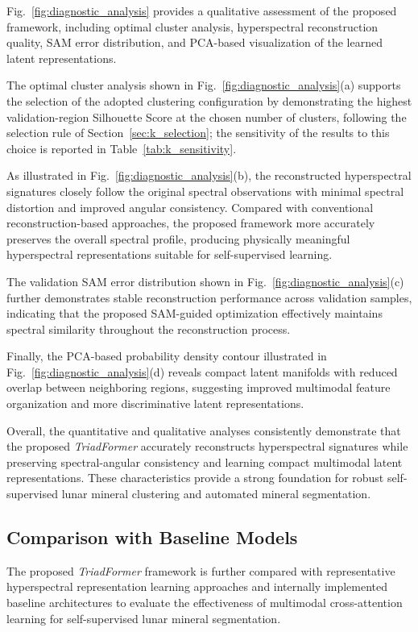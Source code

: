 \documentclass[pdflatex,sn-mathphys-num]{sn-jnl}
\begin{document}
Fig.~\ref{fig:diagnostic_analysis} provides a qualitative assessment of the proposed framework, including optimal cluster analysis, hyperspectral reconstruction quality, SAM error distribution, and PCA-based visualization of the learned latent representations.

The optimal cluster analysis shown in Fig.~\ref{fig:diagnostic_analysis}(a) supports the selection of the adopted clustering configuration by demonstrating the highest validation-region Silhouette Score at the chosen number of clusters, following the selection rule of Section~\ref{sec:k_selection}; the sensitivity of the results to this choice is reported in Table~\ref{tab:k_sensitivity}.

As illustrated in Fig.~\ref{fig:diagnostic_analysis}(b), the reconstructed hyperspectral signatures closely follow the original spectral observations with minimal spectral distortion and improved angular consistency. Compared with conventional reconstruction-based approaches, the proposed framework more accurately preserves the overall spectral profile, producing physically meaningful hyperspectral representations suitable for self-supervised learning.

The validation SAM error distribution shown in Fig.~\ref{fig:diagnostic_analysis}(c) further demonstrates stable reconstruction performance across validation samples, indicating that the proposed SAM-guided optimization effectively maintains spectral similarity throughout the reconstruction process.

Finally, the PCA-based probability density contour illustrated in Fig.~\ref{fig:diagnostic_analysis}(d) reveals compact latent manifolds with reduced overlap between neighboring regions, suggesting improved multimodal feature organization and more discriminative latent representations.

Overall, the quantitative and qualitative analyses consistently demonstrate that the proposed \textit{TriadFormer} accurately reconstructs hyperspectral signatures while preserving spectral-angular consistency and learning compact multimodal latent representations. These characteristics provide a strong foundation for robust self-supervised lunar mineral clustering and automated mineral segmentation.

\subsection{Comparison with Baseline Models}

The proposed \textit{TriadFormer} framework is further compared with representative hyperspectral representation learning approaches and internally implemented baseline architectures to evaluate the effectiveness of multimodal cross-attention learning for self-supervised lunar mineral segmentation.
\end{document}
